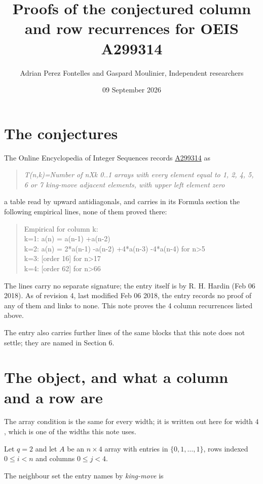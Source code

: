 \documentclass[11pt]{article}
\title{Proofs of the conjectured column and row recurrences for OEIS A299314}
\author{Adrian Perez Fontelles and Gaspard Moulinier, Independent researchers}
\date{09 September 2026}
\theoremstyle{definition}
\begin{document}
\maketitle
\section{The conjectures}

The Online Encyclopedia of Integer Sequences records \href{https://oeis.org/A299314}{A299314} as

\begin{quote}\itshape T(n,k)=Number of nXk 0..1 arrays with every element equal to 1, 2, 4, 5, 6 or 7 king-move adjacent elements, with upper left element zero\end{quote}

a table read by upward antidiagonals, and carries in its Formula section the following empirical lines, none of them proved there:

\begin{quote}\ttfamily Empirical for column k:\\
k=1: a(n) = a(n-1) +a(n-2)\\k=2: a(n) = 2*a(n-1) -a(n-2) +4*a(n-3) -4*a(n-4) for n>5\\k=3: [order 16] for n>17\\k=4: [order 62] for n>66\end{quote}

The lines carry no separate signature; the entry itself is by R. H. Hardin (Feb 06 2018). As of revision 4, last modified Feb 06 2018, the entry records no proof of any of them and links to none. This note proves the 4 column recurrences listed above.

The entry also carries further lines of the same blocks that this note does not settle; they are named in Section 6.

\section{The object, and what a column and a row are}

The array condition is the same for every width; it is written out here for width $4$, which is one of the widths this note uses.

Let $q = 2$ and let $A$ be an $n \times 4$ array with entries in $\{0,1,\dots,1\}$, rows indexed $0 \le i < n$ and columns $0 \le j < 4$.

The neighbour set the entry names by {\itshape king-move} is
\end{document}
